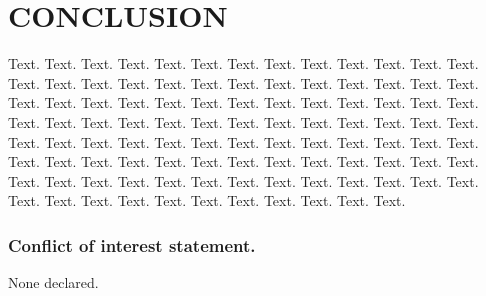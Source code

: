 \documentclass[a4,center,fleqn]{NAR}
\begin{document}
\section{CONCLUSION}

Text. Text. Text. Text. Text. Text. Text. Text. Text. Text. Text.
Text. Text. Text. Text. Text. Text. Text. Text. Text. Text. Text.
Text. Text. Text. Text. Text. Text. Text. Text. Text. Text. Text.
Text. Text. Text. Text. Text. Text. Text. Text. Text. Text. Text.
Text. Text. Text. Text. Text. Text. Text. Text. Text. Text. Text.
Text. Text. Text. Text. Text. Text. Text. Text. Text. Text. Text.
Text. Text. Text. Text. Text. Text. Text. Text. Text. Text. Text.
Text. Text. Text. Text. Text. Text. Text. Text. Text. Text. Text.
Text. Text. Text. Text. Text. Text. Text. Text. Text. Text. Text.
Text. Text. Text.

\subsubsection{Conflict of interest statement.} None declared.
\newpage

\nocite{Ayoub2017}
\nocite{BioJava2012}


\end{document}
